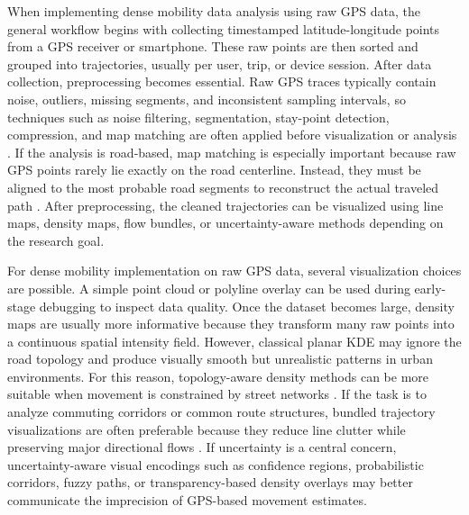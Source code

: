 \documentclass[conference]{IEEEtran}
\begin{document}
When implementing dense mobility data analysis using raw GPS data, the general workflow begins with collecting timestamped latitude-longitude points from a GPS receiver or smartphone. These raw points are then sorted and grouped into trajectories, usually per user, trip, or device session. After data collection, preprocessing becomes essential. Raw GPS traces typically contain noise, outliers, missing segments, and inconsistent sampling intervals, so techniques such as noise filtering, segmentation, stay-point detection, compression, and map matching are often applied before visualization or analysis \cite{Zheng2015}. If the analysis is road-based, map matching is especially important because raw GPS points rarely lie exactly on the road centerline. Instead, they must be aligned to the most probable road segments to reconstruct the actual traveled path \cite{MillardBall2019}. After preprocessing, the cleaned trajectories can be visualized using line maps, density maps, flow bundles, or uncertainty-aware methods depending on the research goal.

For dense mobility implementation on raw GPS data, several visualization choices are possible. A simple point cloud or polyline overlay can be used during early-stage debugging to inspect data quality. Once the dataset becomes large, density maps are usually more informative because they transform many raw points into a continuous spatial intensity field. However, classical planar KDE may ignore the road topology and produce visually smooth but unrealistic patterns in urban environments. For this reason, topology-aware density methods can be more suitable when movement is constrained by street networks \cite{Feng2021}. If the task is to analyze commuting corridors or common route structures, bundled trajectory visualizations are often preferable because they reduce line clutter while preserving major directional flows \cite{Fadloun2022}. If uncertainty is a central concern, uncertainty-aware visual encodings such as confidence regions, probabilistic corridors, fuzzy paths, or transparency-based density overlays may better communicate the imprecision of GPS-based movement estimates.
\end{document}
